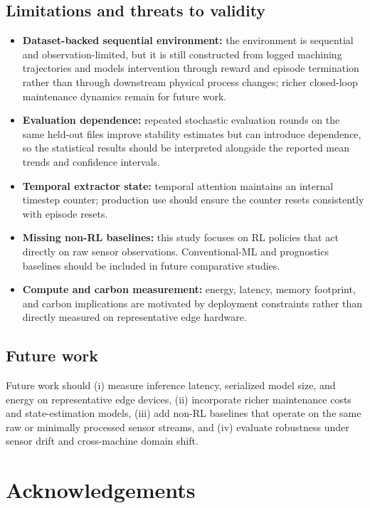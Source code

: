 \documentclass[sn-basic]{sn-jnl} %
\begin{document}
\subsection{Limitations and threats to validity}
\begin{itemize}
	\item \textbf{Dataset-backed sequential environment:} the environment is sequential and observation-limited, but it is still constructed from logged machining trajectories and models intervention through reward and episode termination rather than through downstream physical process changes; richer closed-loop maintenance dynamics remain for future work.
	\item \textbf{Evaluation dependence:} repeated stochastic evaluation rounds on the same held-out files improve stability estimates but can introduce dependence, so the statistical results should be interpreted alongside the reported mean trends and confidence intervals.
	\item \textbf{Temporal extractor state:} temporal attention maintains an internal timestep counter; production use should ensure the counter resets consistently with episode resets.
	\item \textbf{Missing non-RL baselines:} this study focuses on RL policies that act directly on raw sensor observations. Conventional-ML and prognostics baselines should be included in future comparative studies.
	\item \textbf{Compute and carbon measurement:} energy, latency, memory footprint, and carbon implications are motivated by deployment constraints rather than directly measured on representative edge hardware.
\end{itemize}

\subsection{Future work}
Future work should (i) measure inference latency, serialized model size, and energy on representative edge devices, (ii) incorporate richer maintenance costs and state-estimation models, (iii) add non-RL baselines that operate on the same raw or minimally processed sensor streams, and (iv) evaluate robustness under sensor drift and cross-machine domain shift.



\section*{Acknowledgements}
\end{document}
